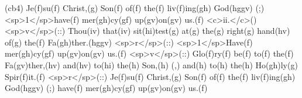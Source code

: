 (cb4) Je(f)su(f) Christ,(g) Son(f) of(f) the(f) liv(f)ing(gh) God(hggv) (;) <sp>1</sp>have(f) mer(gh)cy(gf) up(gv)on(gv) us.(f) <c>ii.</c>() <sp>v</sp>(::) Thou(iv) that(iv) sit(hi)test(g) at(g) the(g) right(g) hand(hv) of(g) the(f) Fa(gh)ther.(hggv) <sp>r</sp>(::) <sp>1</sp>Have(f) mer(gh)cy(gf) up(gv)on(gv) us.(f) <sp>v</sp>(::) Glo(f)ry(f) be(f) to(f) the(f) Fa(gv)ther,(hv) and(hv) to(hi) the(h) Son,(h) (,) and(h) to(h) the(h) Ho(gh)ly(g) Spir(f)it.(f) <sp>r</sp>(::) Je(f)su(f) Christ,(g) Son(f) of(f) the(f) liv(f)ing(gh) God(hggv) (;) have(f) mer(gh)cy(gf) up(gv)on(gv) us.(f)
